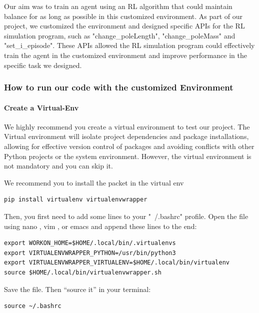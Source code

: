 \documentclass[10pt,a4paper]{article}
\begin{document}
Our aim was to train an agent using an RL algorithm that could maintain balance for as long as possible in this customized environment. As part of our project, we customized the environment and designed specific APIs for the RL simulation program, such as "change\_poleLength", "change\_poleMass" and "set\_i\_episode". These APIs allowed the RL simulation program could effectively train the agent in the customized environment and improve performance in the specific task we designed. 

\subsubsection{How to run our code with the customized Environment}
\paragraph{Create a Virtual-Env}

We highly recommend you create a virtual environment to test our project. The Virtual environment will isolate project dependencies and package installations, allowing for effective version control of packages and avoiding conflicts with other Python projects or the system environment. However, the virtual environment is not mandatory and you can skip it.

We recommend you to install the packet in the virtual env

\begin{lstlisting}[caption={Installation of virtualenv}]
pip install virtualenv virtualenvwrapper
\end{lstlisting}

Then, you first need to add some lines to your "~/.bashrc" profile. Open the file using nano , vim , or emacs and append these lines to the end:

\begin{lstlisting}[caption={Setup of Environment Path}]
export WORKON_HOME=$HOME/.local/bin/.virtualenvs
export VIRTUALENVWRAPPER_PYTHON=/usr/bin/python3
export VIRTUALENVWRAPPER_VIRTUALENV=$HOME/.local/bin/virtualenv
source $HOME/.local/bin/virtualenvwrapper.sh
\end{lstlisting}

Save the file. Then “source it” in your terminal:

\begin{lstlisting}[caption={Setup of Environment Path}]
source ~/.bashrc
\end{lstlisting}
\end{document}
